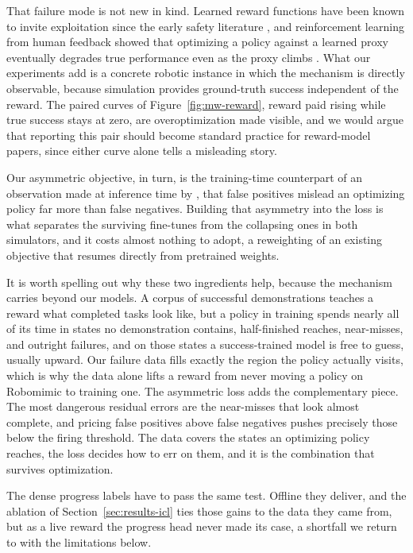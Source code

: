 That failure mode is not new in kind. Learned reward functions have been known to invite exploitation since the early safety literature \citep{amodei_concrete_2016}, and reinforcement learning from human feedback showed that optimizing a policy against a learned proxy eventually degrades true performance even as the proxy climbs \citep{gao_scaling_2023}. What our experiments add is a concrete robotic instance in which the mechanism is directly observable, because simulation provides ground-truth success independent of the reward. The paired curves of Figure~\ref{fig:mw-reward}, reward paid rising while true success stays at zero, are overoptimization made visible, and we would argue that reporting this pair should become standard practice for reward-model papers, since either curve alone tells a misleading story.

Our asymmetric objective, in turn, is the training-time counterpart of an observation made at inference time by \citet{gumbsch_demonstrations_2026}, that false positives mislead an optimizing policy far more than false negatives. Building that asymmetry into the loss is what separates the surviving fine-tunes from the collapsing ones in both simulators, and it costs almost nothing to adopt, a reweighting of an existing objective that resumes directly from pretrained weights.

It is worth spelling out why these two ingredients help, because the mechanism carries beyond our models. A corpus of successful demonstrations teaches a reward what completed tasks look like, but a policy in training spends nearly all of its time in states no demonstration contains, half-finished reaches, near-misses, and outright failures, and on those states a success-trained model is free to guess, usually upward. Our failure data fills exactly the region the policy actually visits, which is why the data alone lifts a reward from never moving a policy on Robomimic to training one. The asymmetric loss adds the complementary piece. The most dangerous residual errors are the near-misses that look almost complete, and pricing false positives above false negatives pushes precisely those below the firing threshold. The data covers the states an optimizing policy reaches, the loss decides how to err on them, and it is the combination that survives optimization.

The dense progress labels have to pass the same test. Offline they deliver, and the ablation of Section~\ref{sec:results-icl} ties those gains to the data they came from, but as a live reward the progress head never made its case, a shortfall we return to with the limitations below.

